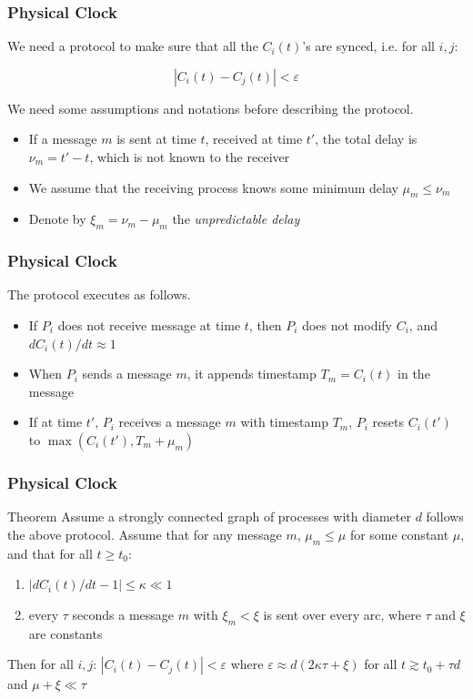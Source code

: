 \documentclass{beamer}
\begin{document}
\frame
{
  \frametitle{Physical Clock}
  We need a protocol to make sure that all the $C_i(t)$'s are synced, i.e. for all $i,j$:

  \[|C_i(t)-C_j(t)|<\varepsilon\]

  \pause
  We need some assumptions and notations before describing the protocol.

  \begin{itemize}
  	\item\pause If a message $m$ is sent at time $t$, received at time $t'$, the total delay is $\nu_m=t'-t$, which is not known to the receiver
  	\item\pause We assume that the receiving process knows some minimum delay $\mu_m\leq\nu_m$
  	\item\pause Denote by $\xi_m=\nu_m-\mu_m$ the \emph{unpredictable delay}
  \end{itemize}
}

\frame
{
  \frametitle{Physical Clock}
  The protocol executes as follows.

  \begin{itemize}
  	\item<2-> If $P_i$ does not receive message at time $t$, then $P_i$ does not modify $C_i$, and $dC_i(t)/dt\approx 1$
  	\item<3-> When $P_i$ sends a message $m$, it appends timestamp $T_m=C_i(t)$ in the message
  	\item<4-> If at time $t'$, $P_i$ receives a message $m$ with timestamp $T_m$, $P_i$ resets $C_i(t')$ to $\max(C_i(t'), T_m+\mu_m)$
  \end{itemize}
}

\frame
{
  \frametitle{Physical Clock}
  \begin{block}{Theorem}
  Assume a strongly connected graph of processes with diameter $d$ follows the above protocol. Assume that for any message $m$, $\mu_m\leq\mu$ for some constant $\mu$, and that for all $t\geq t_0$:
  \begin{enumerate}
  	\item $|dC_i(t)/dt-1|\leq\kappa\ll 1$
  	\item every $\tau$ seconds a message $m$ with $\xi_m<\xi$ is sent over every arc, where $\tau$ and $\xi$ are constants
  \end{enumerate}
  Then for all $i,j$: $|C_i(t)-C_j(t)|<\varepsilon$ where $\varepsilon\approx d(2\kappa\tau+\xi)$ for all $t\gtrsim t_0+\tau d$ and $\mu+\xi\ll\tau$
  \end{block}
}
\end{document}
